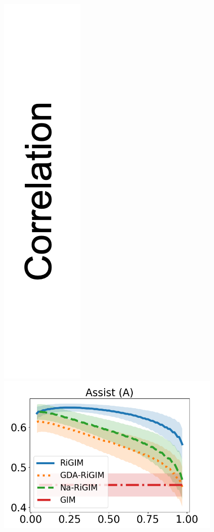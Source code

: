 \documentclass{article}
\begin{document}
\begin{figure}[htbp]
    \begin{minipage}{0.015\textwidth}
    \centering
    \includegraphics[scale=0.15]{figures/correlation_y_label.png}
    \end{minipage}
    \begin{minipage}{0.16\textwidth}
    \centering
    \includegraphics[scale=0.17]{figures/risk_curve_A_shadow.png}\par

\end{minipage}
\end{figure}
\end{document}
